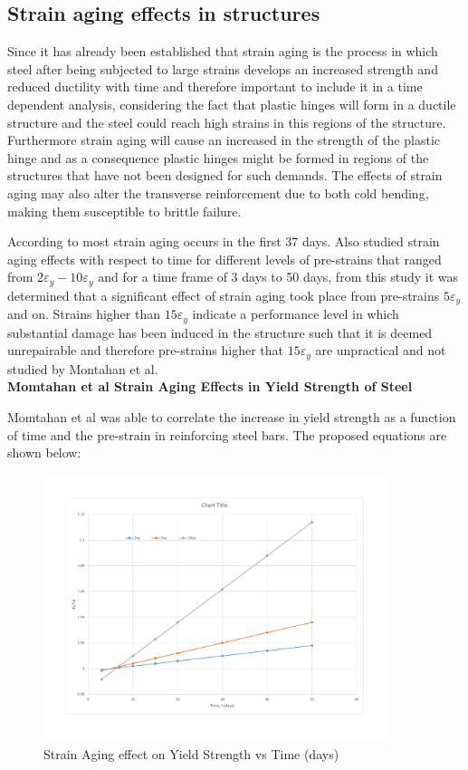 \subsection{Strain aging effects in structures}

Since it has already been established that strain aging is the process in which steel after being subjected to large strains develops an increased strength and reduced ductility with time and therefore important to include it in a time dependent analysis, considering the fact that plastic hinges will form in a ductile structure and the steel could reach high strains in this regions of the structure. Furthermore strain aging will cause an increased in the strength of the plastic hinge and as a consequence plastic hinges might be formed in regions of the structures that have not been designed for such demands. The effects of strain aging may also alter the transverse reinforcement due to both cold bending, making them susceptible to brittle failure.

According to \cite{Restrepo-Posada1994} most strain aging occurs in the first 37 days. Also \cite{Momtahan2009} studied strain aging effects with respect to time for different levels of pre-strains that ranged from $2\varepsilon_y - 10\varepsilon_y$ and for a time frame of 3 days to 50 days, from this study it was determined that a significant effect of strain aging took place from pre-strains $5\varepsilon_y$ and on. Strains higher than $15\varepsilon_y$ indicate a performance level in which substantial damage has been induced in the structure such that it is deemed unrepairable and therefore pre-strains higher that $15\varepsilon_y$ are unpractical and not studied by Montahan et al\cite{Momtahan2009}.
\\
\textbf{Momtahan et al Strain Aging Effects in Yield Strength of Steel}

Momtahan et al was able to correlate the increase in yield strength as a function of time and the pre-strain in reinforcing steel bars. The proposed equations are shown below:

\begin{figure}[htbp]
\centering
\includegraphics[width=0.9\textwidth]{Chapter-4/figs/StrainAging_TimeDependent}
\caption{Strain Aging effect on Yield Strength vs Time (days)}
\label{fig:hist4}
\end{figure}


